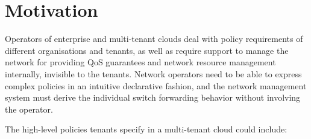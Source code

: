 \section{Motivation}


Operators of enterprise and multi-tenant clouds deal with policy
requirements of different organisations and tenants, as well as
require support to manage the network for providing QoS guarantees and
network resource management internally, invisible to the
tenants. Network operators need to be able to express complex policies
in an intuitive declarative fashion, and the network management system
must derive the individual switch forwarding behavior without
involving the operator.

The high-level policies tenants specify in a multi-tenant cloud could include:

